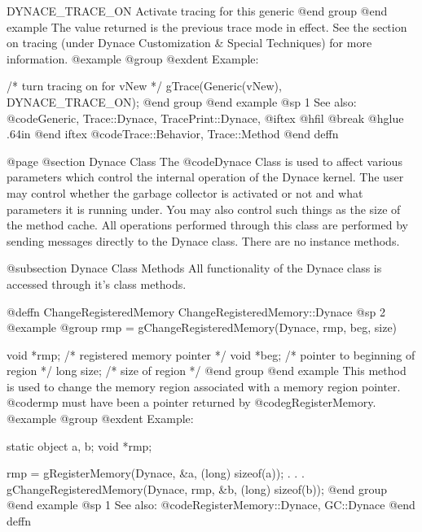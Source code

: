 DYNACE_TRACE_ON          Activate tracing for this generic
@end group
@end example
The value returned is the previous trace mode in effect.  See the
section on tracing (under Dynace Customization & Special Techniques) for
more information.
@example
@group
@exdent Example:

/* turn tracing on for vNew */
gTrace(Generic(vNew), DYNACE_TRACE_ON); 
@end group
@end example
@sp 1
See also:  @code{Generic, Trace::Dynace, TracePrint::Dynace,}
@iftex
@hfil @break @hglue .64in 
@end iftex
@code{Trace::Behavior, Trace::Method}
@end deffn















@page
@section Dynace Class
The @code{Dynace} Class is used to affect various parameters which control
the internal operation of the Dynace kernel.  The user may control whether
the garbage collector is activated or not and what parameters it is
running under.  You may also control such things as the size of the
method cache.  All operations performed through this class are performed
by sending messages directly to the Dynace class.  There are no instance
methods.


@subsection Dynace Class Methods
All functionality of the Dynace class is accessed through it's class methods.







@deffn {ChangeRegisteredMemory} ChangeRegisteredMemory::Dynace
@sp 2
@example
@group
rmp = gChangeRegisteredMemory(Dynace, rmp, beg, size)

void    *rmp;   /*  registered memory pointer  */
void    *beg;   /*  pointer to beginning of region  */
long    size;   /*  size of region  */
@end group
@end example
This method is used to change the memory region associated with
a memory region pointer.  @code{rmp} must have been a pointer returned by
@code{gRegisterMemory}.
@example
@group
@exdent Example:

static  object  a, b;
void    *rmp;

rmp = gRegisterMemory(Dynace, &a, (long) sizeof(a));
   .
   .
   .
gChangeRegisteredMemory(Dynace, rmp, &b, (long) sizeof(b));
@end group
@end example
@sp 1
See also:  @code{RegisterMemory::Dynace, GC::Dynace}
@end deffn







